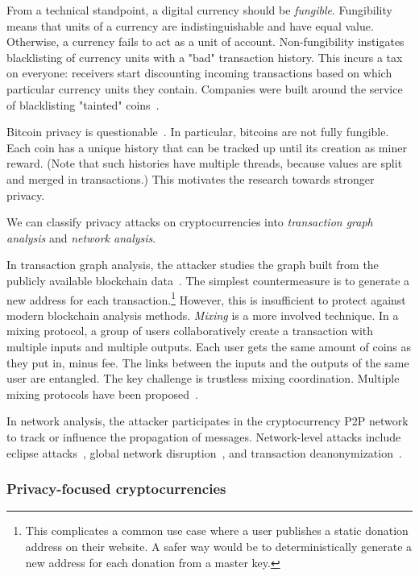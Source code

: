 From a technical standpoint, a digital currency should be \textit{fungible}.
Fungibility means that units of a currency are indistinguishable and have equal value.
Otherwise, a currency fails to act as a unit of account.
Non-fungibility instigates blacklisting of currency units with a "bad" transaction history.
This incurs a tax on everyone: receivers start discounting incoming transactions based on which particular currency units they contain.
Companies were built around the service of blacklisting "tainted" coins~\cite{Elliptic, Chainalysis}.

Bitcoin privacy is questionable~\cite{Reid2011,Androulaki2013}.
In particular, bitcoins are not fully fungible.
Each coin has a unique history that can be tracked up until its creation as miner reward.
(Note that such histories have multiple threads, because values are split and merged in transactions.)
This motivates the research towards stronger privacy.

We can classify privacy attacks on cryptocurrencies into \textit{transaction graph analysis} and \textit{network analysis}.

In transaction graph analysis, the attacker studies the graph built from the publicly available blockchain data~\cite{Meiklejohn2013, Ober2013, Ron2013}.
The simplest countermeasure is to generate a new address for each transaction.\footnote{This complicates a common use case where a user publishes a static donation address on their website. A safer way would be to deterministically generate a new address for each donation from a master key.}
However, this is insufficient to protect against modern blockchain analysis methods.
\textit{Mixing} is a more involved technique.
In a mixing protocol, a group of users collaboratively create a transaction with multiple inputs and multiple outputs.
Each user gets the same amount of coins as they put in, minus fee.
The links between the inputs and the outputs of the same user are entangled.
The key challenge is trustless mixing coordination.
Multiple mixing protocols have been proposed~\cite{Maxwell2013, Bonneau2014, Ruffing2014, Valenta2015}.

In network analysis, the attacker participates in the cryptocurrency P2P network to track or influence the propagation of messages.
Network-level attacks include eclipse attacks~\cite{Marcus2018, Henningsen2019}, global network disruption~\cite{Apostolaki2017}, and transaction deanonymization~\cite{Biryukov2014}.


\subsubsection*{Privacy-focused cryptocurrencies}

